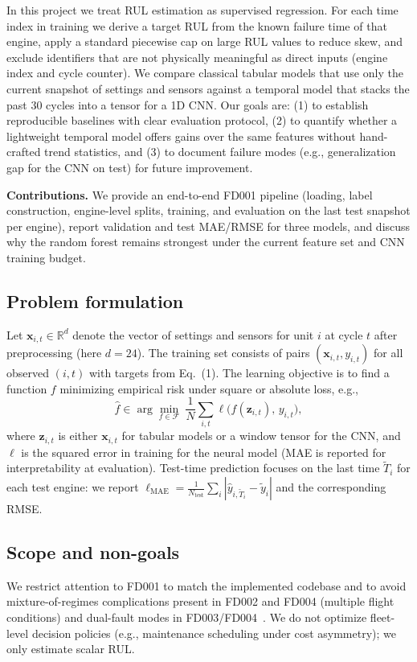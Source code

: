 \documentclass[11pt]{article}
\begin{document}
In this project we treat RUL estimation as supervised regression. For each time index in training we derive a target RUL from the known failure time of that engine, apply a standard piecewise cap on large RUL values to reduce skew, and exclude identifiers that are not physically meaningful as direct inputs (engine index and cycle counter). We compare classical tabular models that use only the current snapshot of settings and sensors against a temporal model that stacks the past 30 cycles into a tensor for a 1D CNN. Our goals are: (1) to establish reproducible baselines with clear evaluation protocol, (2) to quantify whether a lightweight temporal model offers gains over the same features without hand-crafted trend statistics, and (3) to document failure modes (e.g., generalization gap for the CNN on test) for future improvement.

\textbf{Contributions.} We provide an end-to-end FD001 pipeline (loading, label construction, engine-level splits, training, and evaluation on the last test snapshot per engine), report validation and test MAE/RMSE for three models, and discuss why the random forest remains strongest under the current feature set and CNN training budget.

\subsection{Problem formulation}
Let $\mathbf{x}_{i,t} \in \mathbb{R}^{d}$ denote the vector of settings and sensors for unit $i$ at cycle $t$ after preprocessing (here $d{=}24$). The training set consists of pairs $(\mathbf{x}_{i,t}, y_{i,t})$ for all observed $(i,t)$ with targets from Eq.~(1). The learning objective is to find a function $f$ minimizing empirical risk under square or absolute loss, e.g.,
\begin{equation}
  \hat{f} \in \arg\min_{f \in \mathcal{F}} \ \frac{1}{N}\sum_{i,t} \ell\bigl(f(\mathbf{z}_{i,t}),\, y_{i,t}\bigr),
\end{equation}
where $\mathbf{z}_{i,t}$ is either $\mathbf{x}_{i,t}$ for tabular models or a window tensor for the CNN, and $\ell$ is the squared error in training for the neural model (MAE is reported for interpretability at evaluation). Test-time prediction focuses on the last time $\tilde{T}_i$ for each test engine: we report $\ell_{\mathrm{MAE}} = \frac{1}{N_{\mathrm{test}}}\sum_i |\hat{y}_{i,\tilde{T}_i} - \tilde{y}_i|$ and the corresponding RMSE.

\subsection{Scope and non-goals}
We restrict attention to FD001 to match the implemented codebase and to avoid mixture-of-regimes complications present in FD002 and FD004 (multiple flight conditions) and dual-fault modes in FD003/FD004~\cite{saxena2008damage}. We do not optimize fleet-level decision policies (e.g., maintenance scheduling under cost asymmetry); we only estimate scalar RUL.
\end{document}
